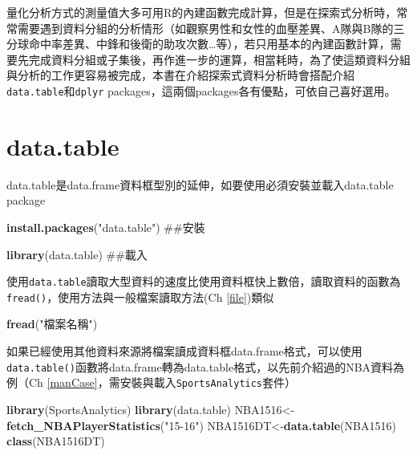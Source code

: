 \documentclass[]{book}
\newenvironment{Shaded}{\begin{snugshade}}{\end{snugshade}}
\newcommand{\KeywordTok}[1]{\textcolor[rgb]{0.13,0.29,0.53}{\textbf{{#1}}}}
\newcommand{\StringTok}[1]{\textcolor[rgb]{0.31,0.60,0.02}{{#1}}}
\newcommand{\NormalTok}[1]{{#1}}
\theoremstyle{definition}
\theoremstyle{definition}
\theoremstyle{remark}
\begin{document}
量化分析方式的測量值大多可用R的內建函數完成計算，但是在探索式分析時，常常需要遇到資料分組的分析情形（如觀察男性和女性的血壓差異、A隊與B隊的三分球命中率差異、中鋒和後衛的助攻次數\ldots{}等），若只用基本的內建函數計算，需要先完成資料分組或子集後，再作進一步的運算，相當耗時，為了使這類資料分組與分析的工作更容易被完成，本書在介紹探索式資料分析時會搭配介紹\texttt{data.table}\citep{R-data.table}和\texttt{dplyr}\citep{R-dplyr}
packages，這兩個packages各有優點，可依自己喜好選用。

\section{data.table}\label{datatable}

data.table是data.frame資料框型別的延伸，如要使用必須安裝並載入data.table\citep{R-data.table}
package

\begin{Shaded}
\begin{Highlighting}[]
\KeywordTok{install.packages}\NormalTok{(}\StringTok{"data.table"}\NormalTok{) ##安裝}
\end{Highlighting}
\end{Shaded}

\begin{Shaded}
\begin{Highlighting}[]
\KeywordTok{library}\NormalTok{(data.table) ##載入}
\end{Highlighting}
\end{Shaded}

使用\texttt{data.table}讀取大型資料的速度比使用資料框快上數倍，讀取資料的函數為\texttt{fread()}，使用方法與一般檔案讀取方法(Ch
\ref{file})類似

\begin{Shaded}
\begin{Highlighting}[]
\KeywordTok{fread}\NormalTok{(}\StringTok{"檔案名稱"}\NormalTok{)}
\end{Highlighting}
\end{Shaded}

如果已經使用其他資料來源將檔案讀成資料框data.frame格式，可以使用\texttt{data.table()}函數將data.frame轉為data.table格式，以先前介紹過的NBA資料為例（Ch
\ref{manCase}，需安裝與載入\texttt{SportsAnalytics}套件）

\begin{Shaded}
\begin{Highlighting}[]
\KeywordTok{library}\NormalTok{(SportsAnalytics)}
\KeywordTok{library}\NormalTok{(data.table)}
\NormalTok{NBA1516<-}\KeywordTok{fetch_NBAPlayerStatistics}\NormalTok{(}\StringTok{"15-16"}\NormalTok{)}
\NormalTok{NBA1516DT<-}\KeywordTok{data.table}\NormalTok{(NBA1516)}
\KeywordTok{class}\NormalTok{(NBA1516DT)}
\end{Highlighting}
\end{Shaded}
\end{document}
